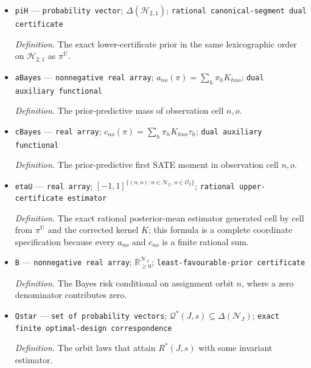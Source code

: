 \documentclass{article}
\begin{document}
\begin{itemize}
  \par\smallskip\noindent\emph{Definition.} The exact upper-certificate prior in the lexicographic order on the 38 elements of \(\mathcal H_{2,1}\) induced first by \(\mathcal U=((0,0),(0,1),(1,0),(1,1))\), then by \(\mathcal T=\operatorname{Sym}^2(\mathcal U)\), and finally by two-pair histograms.
  \item \texttt{piH} --- \texttt{probability vector}; \(\Delta(\mathcal H_{2,1})\); \texttt{rational canonical-\allowbreak{}segment dual certificate}
  \par\smallskip\noindent\emph{Definition.} The exact lower-certificate prior in the same lexicographic order on \(\mathcal H_{2,1}\) as \(\pi^{\mathrm U}\).
  \item \texttt{aBayes} --- \texttt{nonnegative real array}; \(a_{no}(\pi)=\sum_h\pi_hK_{hno}\); \texttt{dual auxiliary functional}
  \par\smallskip\noindent\emph{Definition.} The prior-predictive mass of observation cell \(n,o\).
  \item \texttt{cBayes} --- \texttt{real array}; \(c_{no}(\pi)=\sum_h\pi_hK_{hno}\tau_h\); \texttt{dual auxiliary functional}
  \par\smallskip\noindent\emph{Definition.} The prior-predictive first SATE moment in observation cell \(n,o\).
  \item \texttt{etaU} --- \texttt{real array}; \([-1,1]^{\{(n,o):n\in\mathcal N_2,\ o\in\mathcal O_2\}}\); \texttt{rational upper-\allowbreak{}certificate estimator}
  \par\smallskip\noindent\emph{Definition.} The exact rational posterior-mean estimator generated cell by cell from \(\pi^{\mathrm U}\) and the corrected kernel \(K\); this formula is a complete coordinate specification because every \(a_{no}\) and \(c_{no}\) is a finite rational sum.
  \item \texttt{B} --- \texttt{nonnegative real array}; \(\mathbb R_{\ge0}^{\mathcal N_J}\); \texttt{least-\allowbreak{}favourable-\allowbreak{}prior certificate}
  \par\smallskip\noindent\emph{Definition.} The Bayes risk conditional on assignment orbit \(n\), where a zero denominator contributes zero.
  \item \texttt{Qstar} --- \texttt{set of probability vectors}; \(\mathcal Q^*(J,s)\subseteq\Delta(\mathcal N_J)\); \texttt{exact finite optimal-\allowbreak{}design correspondence}
  \par\smallskip\noindent\emph{Definition.} The orbit laws that attain \(R^*(J,s)\) with some invariant estimator.

\end{itemize}
\end{document}

